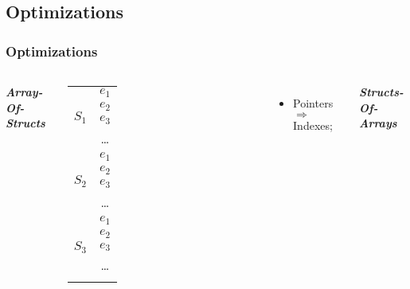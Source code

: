 \subsection{Optimizations}
\begin{frame}
	\frametitle{Optimizations}
	\begin{columns}
		\smaller
			\centering
			\textbf{\itshape Array-Of-Structs}

			\smaller
			\begin{tabular}{|c|c|}
				\hline
				\multirow{4}{*}{$S_{1}$} & $e_{1}$\\
				\cline{2-2}
				& $e_{2}$\\
				\cline{2-2}
				& $e_{3}$\\
				\cline{2-2}
				& \ldots\\
				\hline
				\multirow{4}{*}{$S_{2}$} & $e_{1}$\\
				\cline{2-2}
				& $e_{2}$\\
				\cline{2-2}
				& $e_{3}$\\
				\cline{2-2}
				& \ldots\\

				\hline
				\multirow{5}{*}{$S_{3}$} & $e_{1}$\\
				\cline{2-2}
				& $e_{2}$\\
				\cline{2-2}
				& $e_{3}$\\
				\cline{2-2}
				& \dots\\
				\hline
				\multicolumn{2}{|c|}{\ldots}
			\end{tabular}
			\larger

			\begin{itemize}
				\item Pointers $\Rightarrow$ Indexes;
			\end{itemize}

			\centering
			\textbf{\itshape Structs-Of-Arrays}


\end{columns}
\end{frame}
